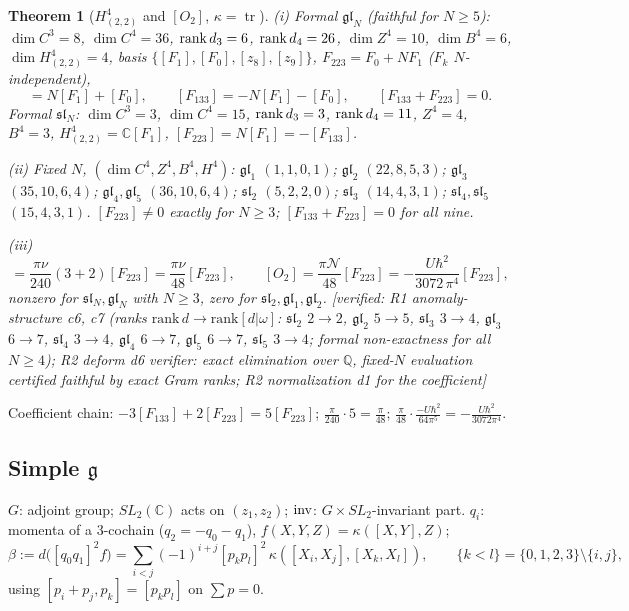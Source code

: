 \documentclass[10pt,a4paper]{article}
\numberwithin{equation}{section}
\newtheorem{theorem}{Theorem}[section]
\theoremstyle{definition}
\theoremstyle{remark}
\newcommand{\tr}{\operatorname{tr}}
\newcommand{\g}{\mathfrak g}
\newcommand{\fsl}{\mathfrak{sl}}
\newcommand{\fgl}{\mathfrak{gl}}
\newcommand{\cN}{\mathcal N}
\newcommand{\ver}[1]{\textup{[verified: #1]}}
\begin{document}
\begin{theorem}[$H^4_{(2,2)}$ and {$[O_2]$}, $\kappa=\tr$]\label{thm-class-slN}
(i) Formal $\fgl_N$ (faithful for $N\ge5$): $\dim C^3=8$, $\dim C^4=36$, ${\rm rank}\,d_3=6$, ${\rm rank}\,d_4=26$, $\dim Z^4=10$, $\dim B^4=6$, $\dim H^4_{(2,2)}=4$, basis $\{[F_1],[F_0],[z_8],[z_9]\}$, $F_{223}=F_0+NF_1$ ($F_k$ $N$-independent),
\begin{equation}
[F_{223}]=N[F_1]+[F_0],\qquad [F_{133}]=-N[F_1]-[F_0],\qquad [F_{133}+F_{223}]=0 .
\end{equation}
Formal $\fsl_N$: $\dim C^3=3$, $\dim C^4=15$, ${\rm rank}\,d_3=3$, ${\rm rank}\,d_4=11$, $Z^4=4$, $B^4=3$, $H^4_{(2,2)}=\mathbb C[F_1]$, $[F_{223}]=N[F_1]=-[F_{133}]$.

(ii) Fixed $N$, $(\dim C^4,Z^4,B^4,H^4)$: $\fgl_1$ $(1,1,0,1)$; $\fgl_2$ $(22,8,5,3)$; $\fgl_3$ $(35,10,6,4)$; $\fgl_4,\fgl_5$ $(36,10,6,4)$; $\fsl_2$ $(5,2,2,0)$; $\fsl_3$ $(14,4,3,1)$; $\fsl_4,\fsl_5$ $(15,4,3,1)$. $[F_{223}]\neq0$ exactly for $N\ge3$; $[F_{133}+F_{223}]=0$ for all nine.

(iii)
\begin{equation}
[o_2]=\frac{\pi\nu}{240}(3+2)[F_{223}]=\frac{\pi\nu}{48}[F_{223}],\qquad [O_2]=\frac{\pi\cN}{48}[F_{223}]=-\frac{U\hbar^2}{3072\,\pi^4}[F_{223}],
\end{equation}
nonzero for $\fsl_N,\fgl_N$ with $N\ge3$, zero for $\fsl_2,\fgl_1,\fgl_2$.
\ver{R1 anomaly-structure c6, c7 (ranks $\mathrm{rank}\,d\to\mathrm{rank}[d|\omega]$: $\fsl_2$ $2\to2$, $\fgl_2$ $5\to5$, $\fsl_3$ $3\to4$, $\fgl_3$ $6\to7$, $\fsl_4$ $3\to4$, $\fgl_4$ $6\to7$, $\fgl_5$ $6\to7$, $\fsl_5$ $3\to4$; formal non-exactness for all $N\ge4$); R2 deform d6 verifier: exact elimination over $\mathbb Q$, fixed-$N$ evaluation certified faithful by exact Gram ranks; R2 normalization d1 for the coefficient}
\end{theorem}
Coefficient chain: $-3[F_{133}]+2[F_{223}]=5[F_{223}]$; $\frac{\pi}{240}\cdot5=\frac\pi{48}$; $\frac{\pi}{48}\cdot\frac{-U\hbar^2}{64\pi^5}=-\frac{U\hbar^2}{3072\pi^4}$.

\subsection{\texorpdfstring{Simple $\g$}{Simple g}}\label{sec-simple}

$G$: adjoint group; $SL_2(\mathbb C)$ acts on $(z_1,z_2)$; ${\rm inv}$: $G\times SL_2$-invariant part. $q_i$: momenta of a 3-cochain ($q_2=-q_0-q_1$), $f(X,Y,Z)=\kappa([X,Y],Z)$;
\begin{equation}
\beta:=d\big([q_0q_1]^2f\big)=\sum_{i<j}(-1)^{i+j}[p_kp_l]^2\,\kappa([X_i,X_j],[X_k,X_l]),\qquad\{k<l\}=\{0,1,2,3\}\setminus\{i,j\},
\end{equation}
using $[p_i+p_j,p_k]=[p_kp_l]$ on $\sum p=0$.
\end{document}
